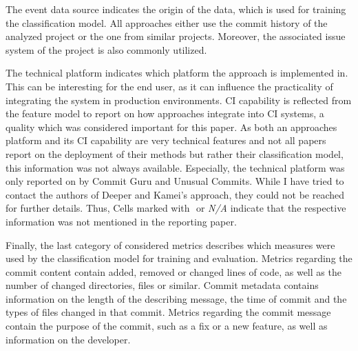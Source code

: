 The event data source indicates the origin of the data, which is used for training the classification model. All approaches either use the commit history of the analyzed project or the one from similar projects. Moreover, the associated issue system of the project is also commonly utilized.

\newcommand{\pointyes}{\CIRCLE}
\newcommand{\pnotapplicable}{\LEFTcircle}
\newcommand{\pointno}{\Circle}

The technical platform indicates which platform the approach is implemented in. This can be interesting for the end user, as it can influence the practicality of integrating the system in production environments. CI capability is reflected from the feature model to report on how approaches integrate into CI systems, a quality which was considered important for this paper. As both an approaches platform and its CI capability are very technical features and not all papers report on the deployment of their methods but rather their classification model, this information was not always available. Especially, the technical platform was only reported on by Commit Guru and Unusual Commits. While I have tried to contact the authors of Deeper and Kamei's approach, they could not be reached for further details. Thus, Cells marked with \pnotapplicable $ $ or \textit{N/A} indicate that the respective information was not mentioned in the reporting paper.

Finally, the last category of considered metrics describes which measures were used by the classification model for training and evaluation. Metrics regarding the commit content contain added, removed or changed lines of code, as well as the number of changed directories, files or similar. Commit metadata contains information on the length of the describing message, the time of commit and the types of files changed in that commit. Metrics regarding the commit message contain the purpose of the commit, such as a fix or a new feature, as well as information on the developer.


